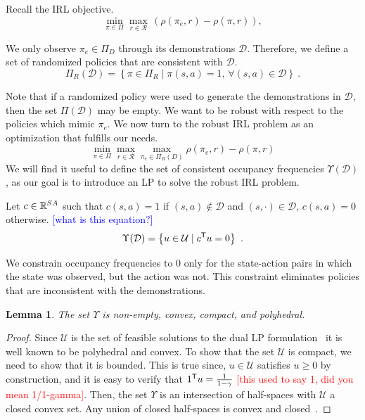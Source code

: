 \documentclass[11pt]{uai2023}
\newtheorem{lemma}{Lemma}
\newcommand{\mm}[1]{\textcolor{blue}{[#1]}}
\newcommand{\gersi}[1]{\textcolor{red}{[#1]}}
\begin{document}
Recall the IRL objective.
\begin{equation}
	\min_{\pi \in \Pi} \max_{r \in \mathcal{R}}  \, (\rho(\pi_e, r) - \rho(\pi, r)),
\end{equation}

We only observe $\pi_e \in \Pi_D$ through its demonstrations $\mathcal{D}$. Therefore, we define a set of randomized policies that are consistent with $\mathcal{D}$.
%
\begin{equation} \label{eq:consistent-policies}
	\Pi_R(\mathcal{D}) = \left\{ \pi \in \Pi_R \mid \pi(s,a) = 1, \, \forall (s,a) \in \mathcal{D} \right\}~.
\end{equation}

Note that if a randomized policy were used to generate the demonstrations in
$\mathcal{D}$, then the set $\Pi(\mathcal{D})$ may be empty. We want to be robust with respect to the policies which mimic $\pi_e$.
We now turn to the robust IRL problem as an optimization that fulfills our needs.
%
\begin{equation}
	\label{eq:robust_IRL_formulation}
	\min_{\pi \in \Pi} \max_{r \in \mathcal{R}} \max_{\pi_e \in \Pi_{R}(D)} \rho(\pi_e, r) - \rho(\pi, r)
\end{equation}
%
We will find it useful to define the set of consistent occupancy frequencies $\Upsilon(\mathcal{D})$, as our goal is to introduce an LP to solve
the robust IRL problem.

Let $c \in \mathbb{R}^{SA}$ such that $c(s,a) = 1$ if $(s,a) \notin \mathcal{D}$ and $(s, \cdot) \in \mathcal{D}$, $c(s,a)  = 0$ otherwise. \mm{what is this equation?}
%
\begin{equation}\label{eq:consistent-occupancies}
	\Upsilon(\mathcal{D}) = \left\{ u \in \mathcal{U} \mid c^{\mathsf{T}} u = 0  \right\}~.
\end{equation}


We constrain occupancy frequencies to 0 only for the state-action pairs in which the state was observed, but the action was not. This constraint eliminates policies that are inconsistent with the demonstrations.
%
\begin{lemma}\label{prop:convexity_of_Upsilon}
The set $\Upsilon$ is non-empty, convex, compact, and polyhedral.
\end{lemma}
\begin{proof}
Since $\mathcal{U}$ is the set of feasible solutions to the dual LP formulation~\cite[Eq.~(6.9.2)]{Puterman1994} it is well known to be polyhedral and convex. To show that the set $\mathcal{U}$ is compact, we need to show that it is bounded. This is true since, $u \in \mathcal{U}$ satisfies $u \ge 0$ by construction, and it is easy to verify that $1^{\mathsf{T}} u = \frac{1}{1-\gamma}$ \gersi{this used to say 1, did you mean 1/1-gamma}. Then, the set $\Upsilon$ is an intersection of half-spaces with $\mathcal{U}$ a closed convex set. Any union of closed half-spaces is convex and closed~\cite[eq.~(2.2.1)]{boyd_convex_optimization}.
\end{proof}
\end{document}
